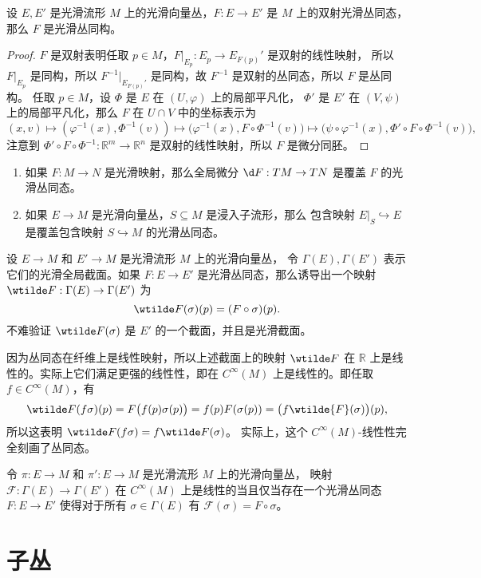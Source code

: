 \begin{proposition}
  设 $E,E'$ 是光滑流形 $M$ 上的光滑向量丛，$F:E\to E'$ 是
  $M$ 上的双射光滑丛同态，那么 $F$ 是光滑丛同构。
\end{proposition}
\begin{proof}
  $F$ 是双射表明任取 $p\in M$，$F|_{E_p}:E_p\to E_{F(p)}'$ 是双射的线性映射，
  所以 $F|_{E_p}$ 是同构，所以 $F^{-1}|_{E_{F(p)}'}$ 是同构，故
  $F^{-1}$ 是双射的丛同态，所以 $F$ 是丛同构。
  任取 $p\in M$，设 $\varPhi$ 是 $E$ 在 $(U,\varphi)$ 上的局部平凡化，
  $\varPhi'$ 是 $E'$ 在 $(V,\psi)$ 上的局部平凡化，那么 
  $F$ 在 $U\cap V$ 中的坐标表示为
  \[
    (x,v)\mapsto (\varphi^{-1}(x),\varPhi^{-1}(v))\mapsto \bigl(\varphi^{-1}(x),F\circ\varPhi^{-1}(v)\bigr)  
    \mapsto \bigl(\psi\circ\varphi^{-1}(x),\varPhi'\circ F\circ\varPhi^{-1}(v)\bigr),
  \]
  注意到 $\varPhi'\circ F\circ\varPhi^{-1}:\mathbb{R}^m\to \mathbb{R}^{n}$
  是双射的线性映射，所以 $F$ 是微分同胚。
\end{proof}

\begin{example}[丛同态]
  \mbox{}
  \begin{enumerate}
    \item 如果 $F:M\to N$ 是光滑映射，那么全局微分 $\d F:TM\to TN$
    是覆盖 $F$ 的光滑丛同态。
    \item 如果 $E\to M$ 是光滑向量丛，$S\subseteq M$ 是浸入子流形，那么
    包含映射 $E|_S\hookrightarrow E$ 是覆盖包含映射 $S\hookrightarrow M$
    的光滑丛同态。
  \end{enumerate}
\end{example}

设 $E\to M$ 和 $E'\to M$ 是光滑流形 $M$ 上的光滑向量丛，
令 $\Gamma(E),\Gamma(E')$ 表示它们的光滑全局截面。如果
$F:E\to E'$ 是光滑丛同态，那么诱导出一个映射 $\wtilde F:\Gamma(E)\to\Gamma(E')$
为
\begin{equation}
  \wtilde F(\sigma)(p)=(F\circ\sigma)(p).
\end{equation}
不难验证 $\wtilde F(\sigma)$ 是 $E'$ 的一个截面，并且是光滑截面。

因为丛同态在纤维上是线性映射，所以上述截面上的映射 $\wtilde F$ 在
$\mathbb{R}$ 上是线性的。实际上它们满足更强的线性性，即在 $C^\infty(M)$
上是线性的。即任取 $f\in C^\infty(M)$，有
\[
  \wtilde F(f\sigma)(p)=F\bigl(f(p)\sigma(p)\bigr)
  =f(p)F(\sigma(p))=\bigl(f\wtilde{F}(\sigma)\bigr)(p),
\]
所以这表明 $\wtilde F(f\sigma)=f\wtilde F(\sigma)$。
实际上，这个 $C^\infty(M)$-线性性完全刻画了丛同态。

\begin{lemma}[丛同态表征引理]
  令 $\pi:E\to M$ 和 $\pi':E\to M$ 是光滑流形 $M$ 上的光滑向量丛，
  映射 $\mathcal{F}:\Gamma(E)\to\Gamma(E')$ 在 $C^\infty(M)$
  上是线性的当且仅当存在一个光滑丛同态 $F:E\to E'$
  使得对于所有 $\sigma\in\Gamma(E)$ 有 $\mathcal{F}(\sigma)=F\circ\sigma$。
\end{lemma}




\section{子丛}


